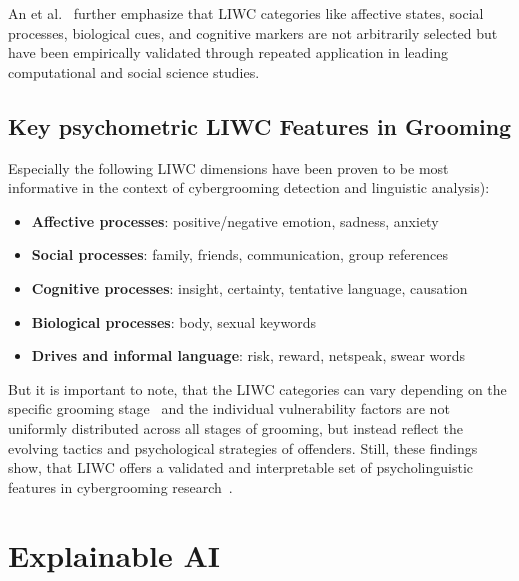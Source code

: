 An et al.~\cite{an2025cybergrooming} further emphasize that LIWC categories like affective states, social processes, biological cues, and cognitive markers are not arbitrarily selected but have been empirically validated through repeated application in leading computational and social science studies. %


\subsection{Key psychometric LIWC Features in Grooming} \label{psychometric_liwc_features_in_grooming}
Especially the following LIWC dimensions have been proven to be most informative in the context of cybergrooming detection and linguistic analysis\cite{gupta2012characterizingpedophileconversationsinternet,broome2020psycholinguistic,an2025cybergrooming}):
\begin{itemize}
    \item \textbf{Affective processes}: positive/negative emotion, sadness, anxiety
    \item \textbf{Social processes}: family, friends, communication, group references
    \item \textbf{Cognitive processes}: insight, certainty, tentative language, causation
    \item \textbf{Biological processes}: body, sexual keywords
    \item \textbf{Drives and informal language}: risk, reward, netspeak, swear words
\end{itemize} %

But it is important to note, that the LIWC categories can vary depending on the specific grooming stage~\cite{Cano2014} and the individual vulnerability factors are not uniformly distributed across all stages of grooming, but instead reflect the evolving tactics and psychological strategies of offenders. Still, these findings show, that LIWC offers a validated and interpretable set of psycholinguistic features in cybergrooming research~\cite{an2025cybergrooming, gupta2012characterizingpedophileconversationsinternet, Cano2014, guo2023text,broome2020psycholinguistic}. 
\section{Explainable AI}

